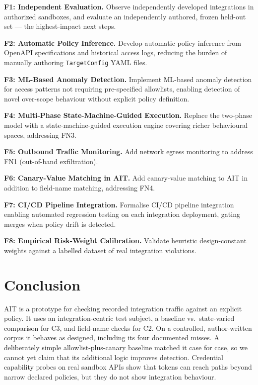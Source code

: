 \documentclass[12pt,a4paper]{report}
\begin{document}
\textbf{F1: Independent Evaluation.}
Observe independently developed integrations in authorized sandboxes, and evaluate an
independently authored, frozen held-out set --- the highest-impact next steps.

\textbf{F2: Automatic Policy Inference.}
Develop automatic policy inference from OpenAPI specifications and historical access logs,
reducing the burden of manually authoring \texttt{TargetConfig} YAML files.

\textbf{F3: ML-Based Anomaly Detection.}
Implement ML-based anomaly detection for access patterns not requiring pre-specified allowlists,
enabling detection of novel over-scope behaviour without explicit policy definition.

\textbf{F4: Multi-Phase State-Machine-Guided Execution.}
Replace the two-phase model with a state-machine-guided execution engine covering richer
behavioural spaces, addressing FN3.

\textbf{F5: Outbound Traffic Monitoring.}
Add network egress monitoring to address FN1 (out-of-band exfiltration).

\textbf{F6: Canary-Value Matching in AIT.}
Add canary-value matching to AIT in addition to field-name matching, addressing FN4.

\textbf{F7: CI/CD Pipeline Integration.}
Formalise CI/CD pipeline integration enabling automated regression testing on each integration
deployment, gating merges when policy drift is detected.

\textbf{F8: Empirical Risk-Weight Calibration.}
Validate heuristic design-constant weights against a labelled dataset of real integration violations.

\chapter{Conclusion}

AIT is a prototype for checking recorded integration traffic against an explicit policy. It uses
an integration-centric test subject, a baseline vs.\ state-varied comparison for C3, and
field-name checks for C2. On a controlled, author-written corpus it behaves as designed, including
its four documented misses. A deliberately simple allowlist-plus-canary baseline matched it case
for case, so we cannot yet claim that its additional logic improves detection. Credential
capability probes on real sandbox APIs show that tokens can reach paths beyond narrow declared
policies, but they do not show integration behaviour.
\end{document}
